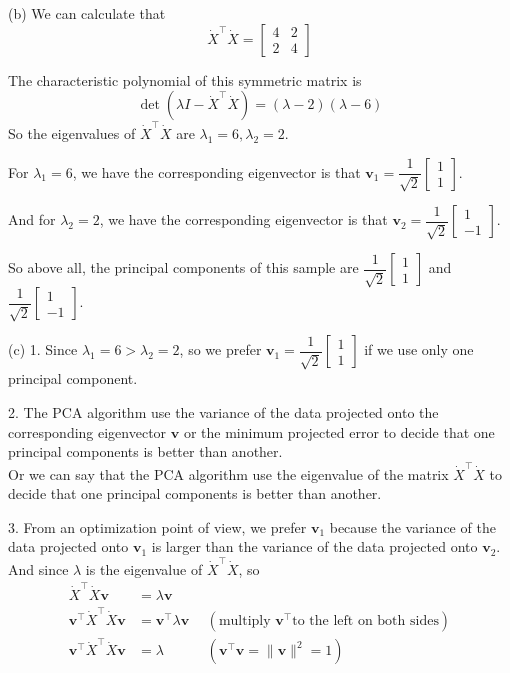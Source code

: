 (b) We can calculate that
$$\dot{X}^{\top} \dot{X} = \begin{bmatrix}
4 & 2 \\
2 & 4
\end{bmatrix}$$

The characteristic polynomial of this symmetric matrix is
$$\det(\lambda I - \dot{X}^{\top} \dot{X})=(\lambda-2)(\lambda-6)$$
So the eigenvalues of $\dot{X}^{\top} \dot{X}$ are $\lambda_1=6, \lambda_2=2$.

For $\lambda_1=6$, we have the corresponding eigenvector is that $\mathbf{v}_1=
\dfrac{1}{\sqrt{2}}\begin{bmatrix} 1 \\ 1 \end{bmatrix}$.

And for $\lambda_2=2$, we have the corresponding eigenvector is that $\mathbf{v}_2=
\dfrac{1}{\sqrt{2}}\begin{bmatrix} 1 \\ -1 \end{bmatrix}$.

So above all, the principal components of this sample are
$\dfrac{1}{\sqrt{2}}\begin{bmatrix} 1 \\ 1 \end{bmatrix}$ and $\dfrac{1}{\sqrt{2}}\begin{bmatrix} 1 \\ -1 \end{bmatrix}$.

(c) 1. Since $\lambda_1=6>\lambda_2=2$, so we prefer $\mathbf{v}_1=\dfrac{1}{\sqrt{2}}\begin{bmatrix} 1 \\ 1 \end{bmatrix}$ if we use only one principal component.

2. The PCA algorithm use the variance of the data projected onto the corresponding eigenvector $\mathbf{v}$ or the minimum projected error to decide that one principal components is better than another. \\
Or we can say that the PCA algorithm use the eigenvalue of the matrix $\dot{X}^{\top} \dot{X}$ to decide that one principal components is better than another.

3. From an optimization point of view, we prefer $\mathbf{v}_1$ because the variance of the data projected onto $\mathbf{v}_1$ is larger than the variance of the data projected onto $\mathbf{v}_2$.
And since $\lambda$ is the eigenvalue of $\dot{X}^{\top} \dot{X}$, so
\begin{align*}
    \dot{X}^{\top} \dot{X}\mathbf{v} &= \lambda\mathbf{v} \\
    \mathbf{v}^{\top}\dot{X}^{\top} \dot{X}\mathbf{v} &= \mathbf{v}^{\top}\lambda\mathbf{v}\ \ &(\text{multiply } \mathbf{v}^{\top} \text{to the left on both sides}) \\
    \mathbf{v}^{\top}\dot{X}^{\top} \dot{X}\mathbf{v} &= \lambda\ \ &(\mathbf{v}^{\top}\mathbf{v}=\|\mathbf{v}\|^2=1)
\end{align*}

